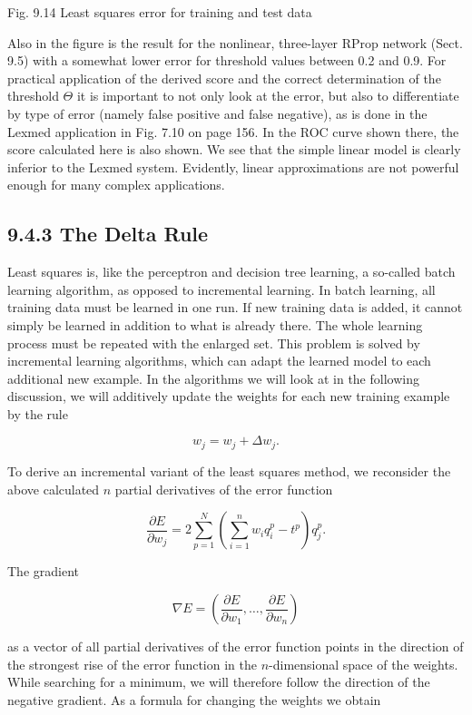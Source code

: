 \documentclass[10pt]{article}
\begin{document}
Fig. 9.14 Least squares error for training and test data

Also in the figure is the result for the nonlinear, three-layer RProp network (Sect. 9.5) with a somewhat lower error for threshold values between 0.2 and 0.9. For practical application of the derived score and the correct determination of the threshold $\Theta$ it is important to not only look at the error, but also to differentiate by type of error (namely false positive and false negative), as is done in the Lexmed application in Fig. 7.10 on page 156. In the ROC curve shown there, the score calculated here is also shown. We see that the simple linear model is clearly inferior to the Lexmed system. Evidently, linear approximations are not powerful enough for many complex applications.

\subsection*{9.4.3 The Delta Rule}
Least squares is, like the perceptron and decision tree learning, a so-called batch learning algorithm, as opposed to incremental learning. In batch learning, all training data must be learned in one run. If new training data is added, it cannot simply be learned in addition to what is already there. The whole learning process must be repeated with the enlarged set. This problem is solved by incremental learning algorithms, which can adapt the learned model to each additional new example. In the algorithms we will look at in the following discussion, we will additively update the weights for each new training example by the rule

$$
w_{j}=w_{j}+\Delta w_{j} .
$$

To derive an incremental variant of the least squares method, we reconsider the above calculated $n$ partial derivatives of the error function

$$
\frac{\partial E}{\partial w_{j}}=2 \sum_{p=1}^{N}\left(\sum_{i=1}^{n} w_{i} q_{i}^{p}-t^{p}\right) q_{j}^{p} .
$$

The gradient

$$
\nabla E=\left(\frac{\partial E}{\partial w_{1}}, \ldots, \frac{\partial E}{\partial w_{n}}\right)
$$

as a vector of all partial derivatives of the error function points in the direction of the strongest rise of the error function in the $n$-dimensional space of the weights. While searching for a minimum, we will therefore follow the direction of the negative gradient. As a formula for changing the weights we obtain
\end{document}
